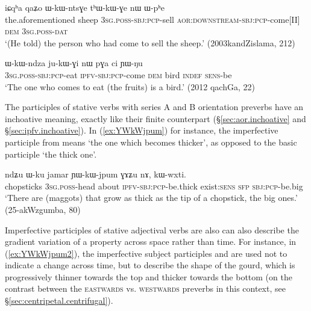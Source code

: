 \begin{exe}
\ex \label{ex:WkWntsGe.thWkWGe}
\gll iɕqʰa qaʑo ɯ-kɯ-ntsɣe tʰɯ-kɯ-ɣe nɯ ɯ-pʰe \\
the.aforementioned sheep \textsc{3sg}.\textsc{poss}-\textsc{sbj}:\textsc{pcp}-sell \textsc{aor}:\textsc{downstream}-\textsc{sbj}:\textsc{pcp}-come[II] \textsc{dem} \textsc{3sg}.\textsc{poss}-\textsc{dat} \\
\glt  `(He told) the person who had come to sell the sheep.' (2003kandZislama, 212)
\end{exe}

\begin{exe}
\ex \label{ex:WkWndza.jukWGi}
\gll ɯ-kɯ-ndza ju-kɯ-ɣi nɯ pɣa ci ɲɯ-ŋu \\
\textsc{3sg}.\textsc{poss}-\textsc{sbj}:\textsc{pcp}-eat \textsc{ipfv}-\textsc{sbj}:\textsc{pcp}-come \textsc{dem} bird \textsc{indef} \textsc{sens}-be \\
\glt   `The one who comes to eat (the fruits) is a bird.' (2012 qachGa, 22)
\end{exe}

The participles of stative verbs with series A and B orientation preverbs have an inchoative meaning, exactly like their finite counterpart (§\ref{sec:aor.inchoative} and §\ref{sec:ipfv.inchoative}).  In (\ref{ex:YWkWjpum}) for instance, the imperfective participle  from  means `the one which becomes thicker', as opposed to the basic participle  `the thick one'.

\begin{exe}
\ex \label{ex:YWkWjpum}
 \gll ndʑu ɯ-ku jamar ɲɯ-kɯ-jpum ɣɤʑu nɤ, kɯ-wxti.  \\
 chopsticks \textsc{3sg}.\textsc{poss}-head about \textsc{ipfv}-\textsc{sbj}:\textsc{pcp}-be.thick exist:\textsc{sens} \textsc{sfp} \textsc{sbj}:\textsc{pcp}-be.big \\
 \glt  `There are (maggots) that grow as thick as the tip of a chopstick, the big ones.' (25-akWzgumba, 80)
\end{exe}

Imperfective participles of stative adjectival verbs are also can also describe the gradient variation of a property across space rather than time. For instance, in (\ref{ex:YWkWjpum2}), the imperfective subject participles  and  are used not to indicate a change across time, but to describe the shape of the gourd, which is progressively thinner towards the top and thicker towards the bottom (on the contrast between the \textsc{eastwards}  vs. \textsc{westwards}  preverbs in this context, see §\ref{sec:centripetal.centrifugal}).

